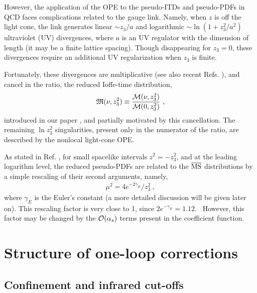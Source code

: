 \documentclass[aps,prd,twocolumn,showpacs,preprintnumbers,superscriptaddress]{revtex4-1}
\begin{document}
However, the application of the OPE
to the pseudo-ITDs  and pseudo-PDFs   in QCD  faces 
 complications   related to the gauge link.  Namely, when $z$ is off the light cone,   
the link  generates 
linear $\sim z_3/a$ and logarithmic $\sim \ln (1+z_3^2/a^2)$  ultraviolet (UV) divergences,
where $a$ is an UV regulator with the dimension of length
(it may be a finite lattice  spacing).   
Though  
 disappearing  for $z_3=0$, these   divergences  
require an additional UV  regularization when $z_3$ is finite.

 
Fortunately, these divergences are multiplicative \mbox{\cite{Polyakov:1980ca,Dotsenko:1979wb,Brandt:1981kf,Aoyama:1981ev,Craigie:1980qs}}  (see also 
 recent Refs. 
 \cite{Ishikawa:2017faj,Ji:2017oey,Green:2017xeu}), and cancel in the ratio,
 the  reduced Ioffe-time distribution,
 \begin{align}
{\mathfrak M} (\nu, z_3^2) \equiv \frac{ {\cal M} (\nu, z_3^2)}{{\cal M} (0, z_3^2)} \   ,
 \label{redm}
\end{align}
 introduced in our paper \cite{Radyushkin:2017cyf}, and partially motivated 
 by this cancellation.
 The remaining $\ln z_3^2$ singularities, present only in the numerator of the ratio,
  are   described by the nonlocal light-cone OPE.
 
 
As stated in Ref.  \cite{Orginos:2017kos}, for 
 small spacelike intervals $z^2=-z_3^2$,  and at the leading logarithm level, the reduced pseudo-PDFs are 
related to the $\overline{\rm MS}$ distributions by a simple rescaling of their second arguments, 
namely,  
\begin{align} 
\mu^2  =4e^{-2\gamma_E}/ z_3^2 
  \  ,
\label{Ptof}
\end{align}  
where $\gamma_E$  is the Euler's constant (a more detailed discussion  will be given later on).  
This  rescaling  factor  is very close to 1, since \mbox{$2e^{-\gamma_E}=1.12$. }
However, this factor may be changed by the $ {\cal O} (\alpha_s) $  terms present in the coefficient function.

  

 

\section{Structure of one-loop corrections} 
 
 \subsection{Confinement and infrared cut-offs}
 
\end{document}
